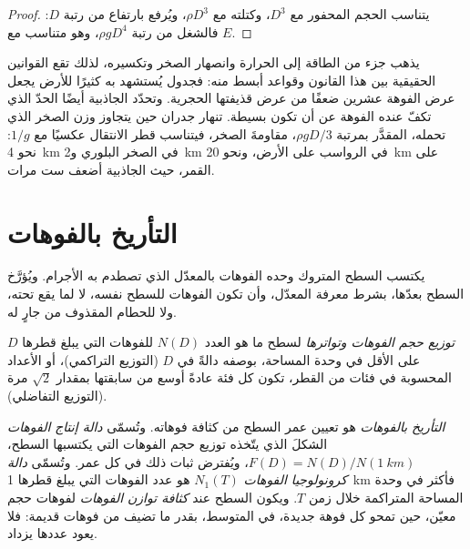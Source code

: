 \begin{proof}
يتناسب الحجم المحفور مع $D^3$، وكتلته مع $\rho D^3$، ويُرفع
بارتفاع من رتبة $D$: فالشغل من رتبة $\rho g D^4$، وهو
متناسب مع $E$.
\end{proof}

يذهب جزء من الطاقة إلى الحرارة وانصهار الصخر وتكسيره، لذلك
تقع القوانين الحقيقية بين هذا القانون وقواعد أبسط منه: فجدول يُستشهد به كثيرًا
للأرض يجعل عرض الفوهة عشرين ضعفًا من عرض قذيفتها الحجرية.
وتحدّد الجاذبية أيضًا الحدّ الذي تكفّ عنده الفوهة عن أن تكون بسيطة.
تنهار جدران  حين يتجاوز وزن الصخر الذي تحمله،
المقدَّر بمرتبة $\rho g D/3$، مقاومةَ الصخر، فيتناسب قطر الانتقال
عكسيًا مع $1/g$: نحو \qty{4}{km} في الصخر البلوري
و\qty{2}{km} في الرواسب على الأرض، ونحو \qty{20}{km} على
القمر، حيث الجاذبية أضعف ست مرات.

\section{التأريخ بالفوهات}\label{sec:b3:planetary-interiors-surfaces:dating}

يكتسب السطح المتروك وحده الفوهات بالمعدّل الذي تصطدم به
الأجرام. ويُؤرَّخ السطح بعدّها، بشرط معرفة المعدّل، وأن تكون الفوهات
للسطح نفسه، لا لما يقع تحته،
ولا للحطام المقذوف من جارٍ له.

\begin{definition}\label{def:b3:planetary-interiors-surfaces:sfd}
\emph{توزيع حجم الفوهات وتواترها} لسطح ما هو العدد $N(D)$
للفوهات التي يبلغ قطرها $D$ على الأقل في وحدة المساحة،
بوصفه دالةً في $D$ (التوزيع التراكمي)، أو الأعداد المحسوبة في فئات من القطر،
تكون كل فئة عادةً أوسع من سابقتها بمقدار $\sqrt2$ مرة
(التوزيع التفاضلي).
\end{definition}

\begin{definition}\label{def:b3:planetary-interiors-surfaces:crater-dating}
\emph{التأريخ بالفوهات} هو تعيين عمر السطح
من كثافة فوهاته. وتُسمّى \emph{دالة إنتاج الفوهات} الشكلَ
الذي يتّخذه
توزيع حجم الفوهات التي يكتسبها السطح، $F(D) =
N(D)/N(\qty{1}{km})$، ويُفترض ثبات ذلك في كل عمر. وتُسمّى
\emph{دالة كرونولوجيا الفوهات} $N_1(T)$ هو عدد الفوهات
التي يبلغ قطرها \qty{1}{km} فأكثر في وحدة المساحة المتراكمة
خلال زمن $T$. ويكون السطح عند \emph{كثافة توازن الفوهات}
لفوهات حجم معيّن، حين
تمحو كل فوهة جديدة، في المتوسط، بقدر ما تضيف من فوهات قديمة:
فلا يعود عددها يزداد.
\end{definition}

